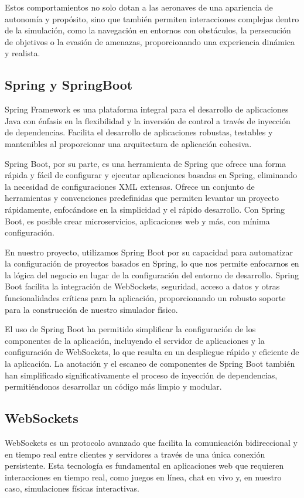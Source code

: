 Estos comportamientos no solo dotan a las aeronaves de una apariencia de autonomía y propósito, sino que también permiten interacciones complejas dentro de la simulación, como la navegación en entornos con obstáculos, la persecución de objetivos o la evasión de amenazas, proporcionando una experiencia dinámica y realista.


\subsection{Spring y SpringBoot}
Spring Framework es una plataforma integral para el desarrollo de aplicaciones Java con énfasis en la flexibilidad y la inversión de control a través de inyección de dependencias. Facilita el desarrollo de aplicaciones robustas, testables y mantenibles al proporcionar una arquitectura de aplicación cohesiva.

Spring Boot, por su parte, es una herramienta de Spring que ofrece una forma rápida y fácil de configurar y ejecutar aplicaciones basadas en Spring, eliminando la necesidad de configuraciones XML extensas. Ofrece un conjunto de herramientas y convenciones predefinidas que permiten levantar un proyecto rápidamente, enfocándose en la simplicidad y el rápido desarrollo. Con Spring Boot, es posible crear microservicios, aplicaciones web y más, con mínima configuración.

En nuestro proyecto, utilizamos Spring Boot por su capacidad para automatizar la configuración de proyectos basados en Spring, lo que nos permite enfocarnos en la lógica del negocio en lugar de la configuración del entorno de desarrollo. Spring Boot facilita la integración de WebSockets, seguridad, acceso a datos y otras funcionalidades críticas para la aplicación, proporcionando un robusto soporte para la construcción de nuestro simulador físico.

El uso de Spring Boot ha permitido simplificar la configuración de los componentes de la aplicación, incluyendo el servidor de aplicaciones y la configuración de WebSockets, lo que resulta en un despliegue rápido y eficiente de la aplicación. La anotación y el escaneo de componentes de Spring Boot también han simplificado significativamente el proceso de inyección de dependencias, permitiéndonos desarrollar un código más limpio y modular.

\subsection{WebSockets}
WebSockets es un protocolo avanzado que facilita la comunicación bidireccional y en tiempo real entre clientes y servidores a través de una única conexión persistente. Esta tecnología es fundamental en aplicaciones web que requieren interacciones en tiempo real, como juegos en línea, chat en vivo y, en nuestro caso, simulaciones físicas interactivas.

